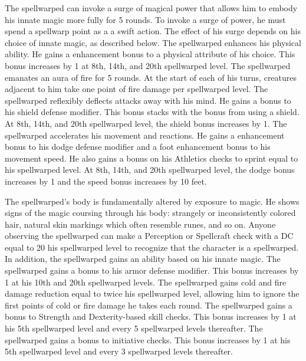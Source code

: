  The spellwarped can invoke a surge of magical power that allows him to embody his innate magic more fully for 5 rounds. To invoke a surge of power, he must spend a spellwarp point as a a swift action. The effect of his surge depends on his choice of innate magic, as described below.
 The spellwarped enhances his physical ability. He gains a  enhancement bonus to a physical attribute of his choice. This bonus increases by 1 at 8th, 14th, and 20th spellwarped level.
 The spellwarped emanates an aura of fire for 5 rounds. At the start of each of his turns, creatures adjacent to him take one point of fire damage per spellwarped level.
 The spellwarped reflexibly deflects attacks away with his mind. He gains a  bonus to his shield defense modifier. This bonus stacks with the bonus from using a shield. At 8th, 14th, and 20th spellwarped level, the shield bonus increases by 1.
 The spellwarped accelerates his movement and reactions. He gains a  enhancement bonus to his dodge defense modifier and a  foot enhancement bonus to his movement speed. He also gains a bonus on his Athletics checks to sprint equal to his spellwarped level. At 8th, 14th, and 20th spellwarped level, the dodge bonus increases by 1 and the speed bonus increases by 10 feet.

 The spellwarped's body is fundamentally altered by exposure to magic. He shows signs of the magic coursing through his body: strangely or inconsistently colored hair, natural skin markings which often resemble runes, and so on. Anyone observing the spellwarped can make a Perception or Spellcraft check with a DC equal to 20 \sub his spellwarped level to recognize that the character is a spellwarped. In addition, the spellwarped gains an ability based on his innate magic.
 The spellwarped gains a  bonus to his armor defense modifier. This bonus increases by 1 at his 10th and 20th spellwarped levels.
 The spellwarped gains cold and fire damage reduction equal to twice his spellwarped level, allowing him to ignore the first points of cold or fire damage he takes each round.
 The spellwarped gains a  bonus to Strength and Dexterity-based skill checks. This bonus increases by 1 at his 5th spellwarped level and every 5 spellwarped levels thereafter.
 The spellwarped gains a  bonus to initiative checks. This bonus increases by 1 at his 5th spellwarped level and every 3 spellwarped levels thereafter.

